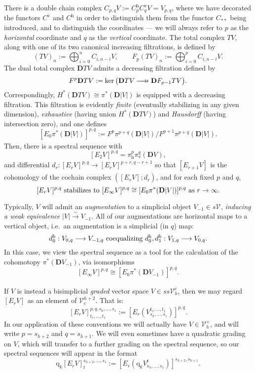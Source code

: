 \documentclass[11pt]{amsart} \renewcommand{\baselinestretch}{1.2}
\theoremstyle{plain}
\numberwithin{equation}{section} %
\theoremstyle{plain}
\numberwithin{equation}{chapter} %
\renewcommand{\ker}{\mathrm{ker}\,}
\renewcommand{\to}{\longrightarrow}
\newcommand{\calV}{\mathcal{V}}
\newcommand{\vect}[2]{\calV^{#1}_{#2}}
\newcommand{\quadgrad}[1]{\mathrm{q}_{#1}}
\newcommand{\epi}{{\,\makebox[0cm][l]{\ensuremath\to}\to{}}}
\newcommand{\Edown}[4]{[E_{#1}#2]^{#3}_{#4}}
\newcommand{\uver}{^\mathrm{v}}
\newcommand{\uhor}{^\mathrm{h}}
\newcommand{\dver}{_\mathrm{v}}
\newcommand{\dhor}{_\mathrm{h}}
\newcommand{\diag}[1]{|#1|}
\newcommand{\dual}{\mathbf{D}}
\begin{document}
\begin{Conventions and notation}
There is a double chain complex $C_{p,q}V:=C\uhor_p C\uver_q V=V_{p,q}$, where we have decorated the  functors $C\uver$ and $C\uhor$ in order to distinguish them from the functor $C_{**}$ being introduced, and to distinguish the coordinates --- we will always refer to $p$ as the \emph{horizontal} coordinate and $q$ as the \emph{vertical} coordinate. The total complex $TV$, along with one of its two canonical increasing filtrations, is defined by 
\[(TV)_n:=\bigoplus_{i=0}^{n}C_{i,n-i}V,\qquad F_p(TV)_n:=\bigoplus_{i=0}^{p}C_{i,n-i}V.\]
The dual total complex $\dual TV$ admits a decreasing filtration defined by
\[F^p\dual TV:=\ker\bigl(\dual TV\epi \dual F_{p-1} TV\bigr).\]
Correspondingly, $H^*(\dual TV)\cong \pi^*(\dual\diag{ V})$ is equipped with a decreasing filtration. This filtration is evidently \emph{finite} (eventually stabilizing in any given dimension), \emph{exhaustive} (having union $H^*(\dual TV)$) and \emph{Hausdorff} (having intersection zero), and one defines
\[\Edown{0}{\pi^*(\dual\diag{ V})}{p,q}{}:=F^{p}\pi^{p+q}(\dual\diag{ V})/F^{p+1}\pi^{p+q}(\dual\diag{ V}).\]
Then, there is a spectral sequence with
\[\Edown{2}{V}{p,q}{}=\pi\dhor^{p}\pi\dver^{q}(\dual V),\]
and differential $d_r:\Edown{r}{V}{p,q}{}\to \Edown{r}{V}{p+r,q-r+1}{}$ so that $\Edown{r+1}{V}{}{}$ is the cohomology of the cochain complex $(\Edown{r}{V}{}{};d_r)$, and for each fixed $p$ and $q$,
\[\Edown{r}{V}{p,q}{}\textup{ stabilizes to }\Edown{\infty}{V}{p,q}{}\cong \Edown{0}{\pi^*(\dual\diag{ V})}{p,q}{}\textup{ as $r\rightarrow\infty$}.\]

Typically, $V$ will admit an \emph{augmentation} to a simplicial object $V_{-1}\in s\vect{}{}$, \emph{inducing a weak equivalence} $\diag{ V}\overset{\sim}{\to}V_{-1}$. All of our  augmentations are horizontal maps to a vertical object, i.e.\ an augmentation is a simplicial (in $q$) map:
\[d\uhor_0:V_{0,q}\to V_{-1,q}\textup{ coequalizing }d\uhor_0,d\uhor_1:V_{1,q}\to V_{0,q}.\]
In this case, we view the spectral sequence as a tool for the calculation of the cohomotopy $\pi^*(\dual V_{-1})$, via isomorphisms
\[\Edown{\infty}{V}{p,q}{}\cong \Edown{0}{\pi^*(\dual V_{-1})}{p,q}{}.\]


If $V$ is instead a bisimplicial \emph{graded} vector space $V\in ss\vect{c}{h}$, then we may regard $\Edown{r}{V}{}{}$ as an element of $\vect{h+2}{c}$. That is:
\[\Edown{r}{V}{p,q,s_h,\ldots,s_1}{t_c,\ldots,t_1}:=\Edown{r}{(V^{t_c,\ldots,t_1}_{s_h,\ldots,s_1})}{p,q}{}.\]
In our application of these conventions we will actually have $V\in \vect{+}{h}$, and will write $p=s_{h+2}$ and $q=s_{h+1}$. We will even sometimes have a quadratic grading on $V$, which will transfer to a further grading on the spectral sequence, so our spectral sequences will appear in the format
\[\quadgrad{k}\Edown{r}{V}{s_{h+2},\ldots,s_1}{t}:=\Edown{r}{(\quadgrad{k}V^{t}_{s_h,\ldots,s_1})}{s_{h+2},s_{h+1}}{}.\]



\end{Conventions and notation}
\end{document}
